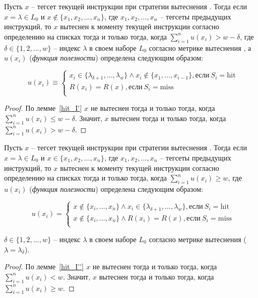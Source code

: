 \begin{lemma} Пусть $x$ -- тегсет текущей инструкции при
стратегии вытеснения \LRU. Тогда если $x = \lambda \in L_0$ и $x
\notin \{x_1, x_2, ..., x_n\}$, где $x_1, x_2, ..., x_n$ -- тегсеты
предыдущих инструкций, то $x$ вытеснен к моменту текущей инструкции
согласно определению \LRU на списках тогда и только тогда, когда
$\sum^n_{i=1} u(x_i) > w - \delta$, где $\delta \in \{1, 2, ...,
w\}$ -- индекс $\lambda$ в своем наборе $L_0$ согласно метрике
вытеснения \LRU, а $u(x_i)$ (\emph{функция полезности}) определена
следующим образом:

$$u(x_i) \equiv \left\{
\begin{array}{l}
    x_i \in \{ \lambda_{\delta+1}, ..., \lambda_w\} \wedge x_i \notin
\{x_1, ..., x_{i-1}\}, \mbox{если}~S_i=\mbox{hit} \\
    R(x_i) = R(x), \mbox{если}~S_i=\mbox{miss}\\
\end{array}
\right.$$

\end{lemma}
\begin{proof}
  По лемме~\ref{hit_I'} $x$ не вытеснен тогда и только тогда, когда $\sum^n_{i=1} u(x_i) \leqslant
  w - \delta$. Значит, $x$ вытеснен тогда и только тогда, когда $\sum^n_{i=1} u(x_i)
  > w - \delta$.
\end{proof}

\begin{lemma}\label{miss_III''} Пусть $x$ -- тегсет текущей
инструкции при стратегии вытеснения \LRU. Тогда если $x = \lambda
\in L_0$ и $x \in \{x_1, x_2, ..., x_n\}$, где $x_1, x_2, ..., x_n$
-- тегсеты предыдущих инструкций, то $x$ вытеснен к моменту текущей
инструкции согласно определению \LRU на списках тогда и только
тогда, когда $\sum^n_{i=1} u(x_i) \geqslant w$, где $u(x_i)$
(\emph{функция полезности}) определена следующим образом:

$$u(x_i) = \left\{
\begin{array}{l}
    x \notin \{x_i, ..., x_n\} \wedge x_i \in \{ \lambda_{\delta+1},
..., \lambda_w\} %
, \mbox{если}~S_i=\mbox{hit} \\
    x \notin \{x_i, ..., x_n\} \wedge R(x_i) = R(x), \mbox{если}~S_i=\mbox{miss}\\
\end{array}
\right.$$

$\delta \in \{1, 2, ..., w\}$ -- индекс $\lambda$ в своем наборе
$L_0$ согласно метрике вытеснения \LRU ($\lambda = \lambda_\delta$).


\end{lemma}
\begin{proof}
  По лемме~\ref{hit_I''} $x$ не вытеснен тогда и только тогда, когда $\sum^n_{i=1} u(x_i)
  < w$. Значит, $x$ вытеснен тогда и только тогда, когда $\sum^n_{i=1} u(x_i)
  \geqslant w$.
\end{proof}

